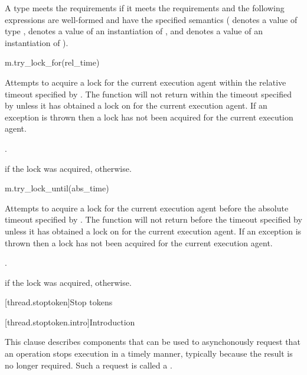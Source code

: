\pnum
A type  meets the  requirements if it meets the 
requirements and the following expressions are well-formed and have the specified semantics
( denotes a value of type ,  denotes a value of an
instantiation of , and  denotes a value
of an instantiation of ).

\begin{itemdecl}
m.try_lock_for(rel_time)
\end{itemdecl}

\begin{itemdescr}
\pnum
\effects
Attempts to acquire a lock for the current execution agent within the relative
timeout specified by . The function will not return
within the timeout specified by  unless it has obtained a lock on 
for the current execution agent. If an exception is thrown then a lock has not been
acquired for the current execution agent.

\pnum
\returntype {}.

\pnum
\returns
{} if the lock was acquired,  otherwise.
\end{itemdescr}

\begin{itemdecl}
m.try_lock_until(abs_time)
\end{itemdecl}

\begin{itemdescr}
\pnum
\effects
Attempts to acquire a lock for the current execution agent before the absolute
timeout specified by . The function will not return
before the timeout specified by  unless it has obtained a lock on  for
the current execution agent. If an exception is thrown then a lock has not been acquired
for the current execution agent.

\pnum
\returntype {}.

\pnum
\returns
{} if the lock was acquired,  otherwise.
\end{itemdescr}

[thread.stoptoken]{Stop tokens}

[thread.stoptoken.intro]{Introduction}

\pnum
This clause describes components that can be used
to asynchonously request that an operation stops execution in a timely manner,
typically because the result is no longer required.
Such a request is called a .

